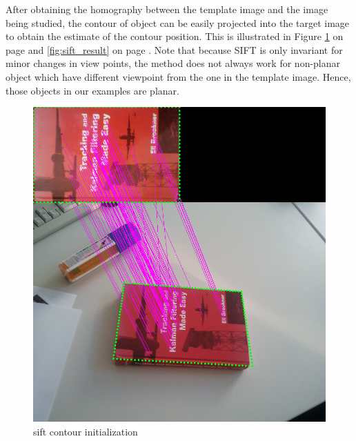 After obtaining the homography between the template image and the
image being studied, the contour of object can be easily projected
into the target image to obtain the estimate of the contour
position. This is illustrated in Figure \ref{fig:sift} on page
\pageref{fig:sift} and \ref{fig:sift_result} on page
\pageref{fig:sift_result}. Note that because SIFT is only invariant for
minor changes in view points, the method does not always work for
non-planar object which have different viewpoint from the one in the
template image. Hence, those objects in our examples are planar.

\begin{figure}[htbp]
  \centering
\includegraphics[width=\linewidth]{images/sift.png}
\caption{sift contour initialization}
\label{fig:sift}
\end{figure}


